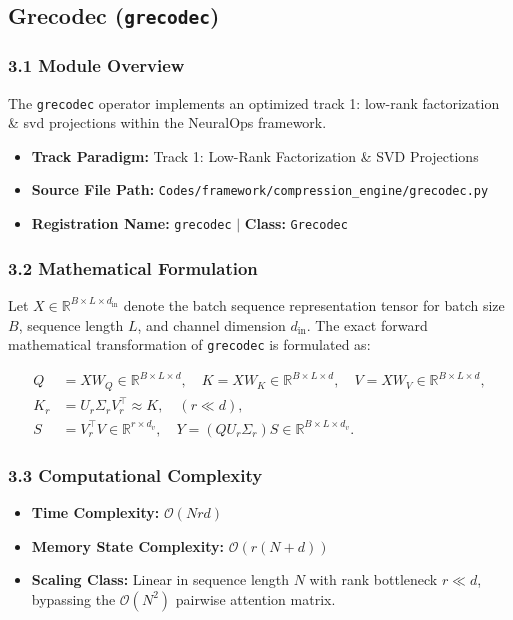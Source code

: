 \subsection{Grecodec (\texttt{grecodec})}
\label{sec:app_module_grecodec}

\subsubsection*{3.1 Module Overview}
The \texttt{grecodec} operator implements an optimized track 1: low-rank factorization \& svd projections within the NeuralOps framework.
\begin{itemize}
    \item \textbf{Track Paradigm:} Track 1: Low-Rank Factorization & SVD Projections
    \item \textbf{Source File Path:} \texttt{Codes/framework/compression\_engine/grecodec.py}
    \item \textbf{Registration Name:} \texttt{grecodec} $\mid$ \textbf{Class:} \texttt{Grecodec}
\end{itemize}

\subsubsection*{3.2 Mathematical Formulation}
Let $X \in \mathbb{R}^{B \times L \times d_{\text{in}}}$ denote the batch sequence representation tensor for batch size $B$, sequence length $L$, and channel dimension $d_{\text{in}}$. The exact forward mathematical transformation of \texttt{grecodec} is formulated as:

\begin{align}
Q &= X W_Q \in \mathbb{R}^{B \times L \times d}, \quad K = X W_K \in \mathbb{R}^{B \times L \times d}, \quad V = X W_V \in \mathbb{R}^{B \times L \times d}, \\
K_r &= U_r \Sigma_r V_r^\top \approx K, \quad (r \ll d), \\
S &= V_r^\top V \in \mathbb{R}^{r \times d_v}, \quad Y = (Q U_r \Sigma_r) S \in \mathbb{R}^{B \times L \times d_v}.
\end{align}


\subsubsection*{3.3 Computational Complexity}
\begin{itemize}
    \item \textbf{Time Complexity:} $\mathcal{O}(N r d)$
    \item \textbf{Memory State Complexity:} $\mathcal{O}(r(N + d))$
    \item \textbf{Scaling Class:} Linear in sequence length $N$ with rank bottleneck $r \ll d$, bypassing the $\mathcal{O}(N^2)$ pairwise attention matrix.
\end{itemize}

